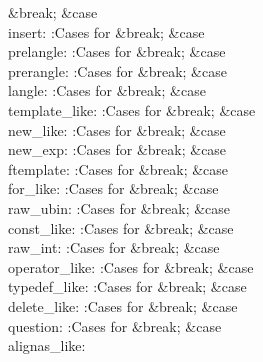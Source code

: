 \&{break};\6
\4\&{case} \\{insert}:\5
:Cases for \X\5
\&{break};\6
\4\&{case} \\{prelangle}:\5
:Cases for \X\5
\&{break};\6
\4\&{case} \\{prerangle}:\5
:Cases for \X\5
\&{break};\6
\4\&{case} \\{langle}:\5
:Cases for \X\5
\&{break};\6
\4\&{case} \\{template\_like}:\5
:Cases for \X\5
\&{break};\6
\4\&{case} \\{new\_like}:\5
:Cases for \X\5
\&{break};\6
\4\&{case} \\{new\_exp}:\5
:Cases for \X\5
\&{break};\6
\4\&{case} \\{ftemplate}:\5
:Cases for \X\5
\&{break};\6
\4\&{case} \\{for\_like}:\5
:Cases for \X\5
\&{break};\6
\4\&{case} \\{raw\_ubin}:\5
:Cases for \X\5
\&{break};\6
\4\&{case} \\{const\_like}:\5
:Cases for \X\5
\&{break};\6
\4\&{case} \\{raw\_int}:\5
:Cases for \X\5
\&{break};\6
\4\&{case} \\{operator\_like}:\5
:Cases for \X\5
\&{break};\6
\4\&{case} \\{typedef\_like}:\5
:Cases for \X\5
\&{break};\6
\4\&{case} \\{delete\_like}:\5
:Cases for \X\5
\&{break};\6
\4\&{case} \\{question}:\5
:Cases for \X\5
\&{break};\6
\4\&{case} \\{alignas\_like}:\5
